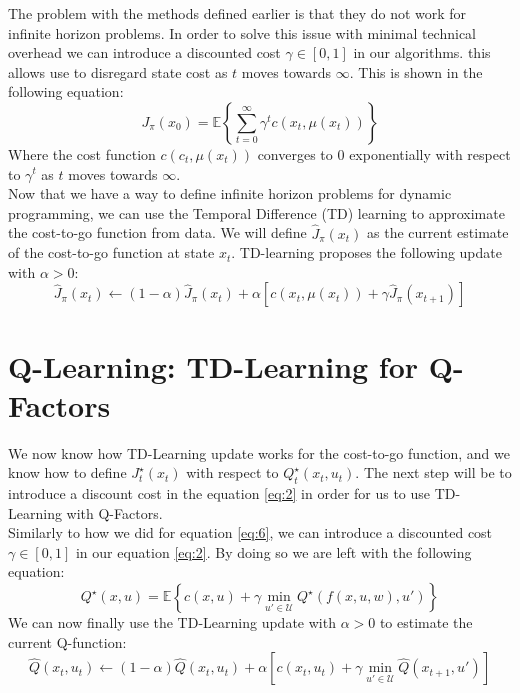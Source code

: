 \documentclass{article}[12pt]
\def\E{\mathbb{E}}
\def \E{\mathbb E}
\begin{document}
The problem with the methods defined earlier is that they do not work for infinite horizon problems. In order to solve this issue with minimal technical overhead we can introduce a discounted cost $\gamma \in [0,1]$ in our algorithms. this allows use to disregard state cost as $t$ moves towards $\infty$. This is shown in the following equation:
\begin{equation}\label{eq:6}
    J_{\pi}(x_0) = \E\left\{\sum_{t=0}^\infty \gamma^t c(x_t,\mu(x_t))\right\}
\end{equation}
Where the cost function $c(c_t,\mu(x_t))$ converges to $0$ exponentially with respect to $\gamma^t$ as $t$ moves towards $\infty$.\\

Now that we have a way to define infinite horizon problems for dynamic programming, we can use the Temporal Difference (TD) learning to approximate the cost-to-go function from data. We will define $\hat J_\pi(x_t)$ as the current estimate of the cost-to-go function at state $x_t$. TD-learning proposes the following update with $\alpha>0$:
\begin{equation}\label{eq:7}
    \hat J_\pi(x_t) \leftarrow (1-\alpha)\hat J_\pi(x_t) + \alpha\left[c(x_t,\mu(x_t))+\gamma \hat J_\pi(x_{t+1})\right]
\end{equation}

\section{Q-Learning: TD-Learning for Q-Factors}

We now know how TD-Learning update works for the cost-to-go function, and we know how to define $J_{t}^\star(x_t)$ with respect to $Q_t^\star(x_t,u_t)$. The next step will be to introduce a discount cost in the equation \eqref{eq:2} in order for us to use TD-Learning with Q-Factors.
\\ 

Similarly to how we did for equation \eqref{eq:6}, we can introduce a discounted cost  $\gamma \in [0,1]$ in our equation \eqref{eq:2}. By doing so we are left with the following equation: 
\begin{equation}\label{eq:8}
    Q^\star(x,u) = \E\left\{c(x,u)+ \gamma\min_{u'\in\mathcal U} Q^\star(f(x,u,w),u')\right\}
\end{equation}
We can now finally use the TD-Learning update with $\alpha>0$ to estimate the current Q-function:
\begin{equation}\label{eq:9}
    \hat{Q}(x_t,u_t) \leftarrow (1-\alpha) \hat{Q}(x_t,u_t) + \alpha\left[c(x_t,u_t)+\gamma\min_{u'\in \mathcal U}\hat{Q}(x_{t+1},u')\right]
\end{equation}
\end{document}
